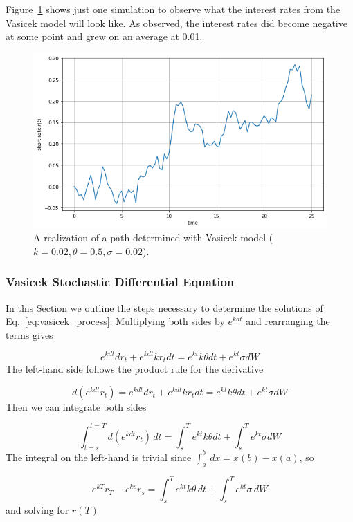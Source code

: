 Figure~\ref{fig:vasicek_path} shows just one simulation to observe what the interest 
rates from the Vasicek model will look like. 
As observed, the interest rates did become negative at some point and grew on an 
average at 0.01.

\begin{figure}[htb]
	\centering
	\includegraphics[width=0.7\linewidth]{figures/vasicek_short_rate}
	\caption{A realization of a path determined with Vasicek model ($k=0.02, \theta=0.5, \sigma=0.02$).}
	\label{fig:vasicek_path}
\end{figure}

\subsubsection{Vasicek Stochastic Differential Equation}
\label{vasicek-stochastic-differential-equation}

In this Section we outline the steps necessary to determine the solutions 
of Eq.~\ref{eq:vasicek_process}.
Multiplying both sides by \(e^{kdt}\) and rearranging the terms gives

\begin{equation*}
	e^{kdt}dr_t + e^{kdt}kr_t dt = e^{kt}k\theta dt + e^{kt}\sigma dW
\end{equation*}
The left-hand side follows the product rule for the derivative

\begin{equation*}
	d(e^{kdt}r_t) = e^{kdt}dr_t + e^{kdt}kr_t dt= e^{kt}k\theta dt + e^{kt}\sigma dW
\end{equation*}
Then we can integrate both sides

\begin{equation*}
	\int^{t=T}_{t=s} d(e^{kdt}r_t)\,dt = \int^T_s e^{kt}k\theta dt +\int^T_s e^{kt}\sigma dW
\end{equation*}
The integral on the left-hand is trivial since \(\int^b_a\,dx = x(b)-x(a)\), so

\begin{equation*}
	e^{kT}r_T - e^{ks}r_s = \int^T_s e^{kt}k\theta\,dt +\int^T_s e^{kt}\sigma\,dW
\end{equation*}
and solving for \(r(T)\)

